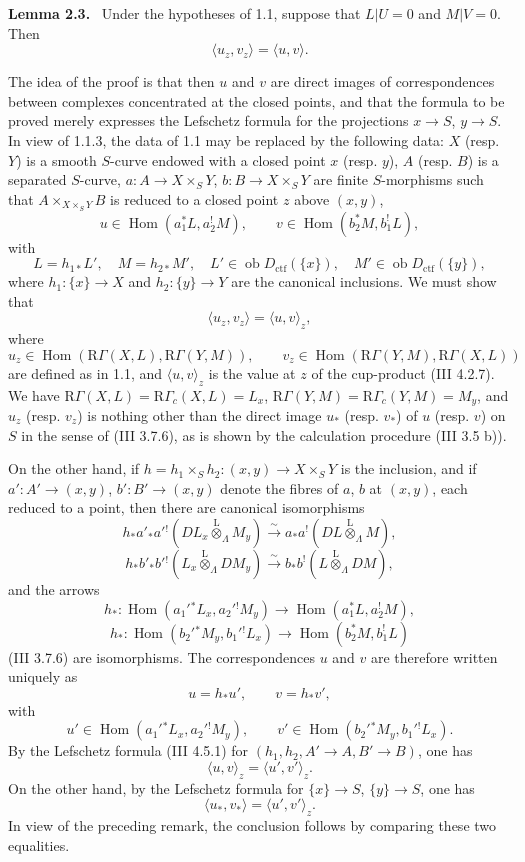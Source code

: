 \documentclass[11pt]{article}
\newenvironment{statement}[1]{\par\medskip\noindent\textbf{#1.}\ }{\par\medskip}
\DeclareMathOperator{\Hom}{Hom}
\providecommand{\lten}{\overset{\mathrm L}{\otimes}}
\providecommand{\Ob}{\operatorname{ob}}
\providecommand{\Hom}{\operatorname{Hom}}
\providecommand{\lten}{\overset{\mathrm L}{\otimes}}
\providecommand{\lten}{\overset{\mathrm L}{\otimes}}
\providecommand{\Ob}{\operatorname{ob}}
\providecommand{\lten}{\overset{\mathrm L}{\otimes}}
\providecommand{\lten}{\overset{\mathrm L}{\otimes}}
\providecommand{\Ob}{\operatorname{Ob}}
\providecommand{\lten}{\overset{\mathrm L}{\otimes}}
\begin{document}
\begin{statement}{Lemma 2.3}
Under the hypotheses of 1.1, suppose that $L|U=0$ and $M|V=0$. Then
\[
\langle u_z,v_z\rangle=\langle u,v\rangle .
\]
\end{statement}

The idea of the proof is that then $u$ and $v$ are direct images of correspondences between complexes concentrated at the closed points, and that the formula to be proved merely expresses the Lefschetz formula for the projections $x\to S$, $y\to S$. In view of 1.1.3, the data of 1.1 may be replaced by the following data: $X$ (resp. $Y$) is a smooth $S$-curve endowed with a closed point $x$ (resp. $y$), $A$ (resp. $B$) is a separated $S$-curve, $a:A\to X\times_S Y$, $b:B\to X\times_S Y$ are finite $S$-morphisms such that $A\times_{X\times_SY}B$ is reduced to a closed point $z$ above $(x,y)$,
\[
u\in\Hom(a_1^*L,a_2^!M),\qquad v\in\Hom(b_2^*M,b_1^!L),
\]
with
\[
L=h_{1*}L',\quad M=h_{2*}M',\quad
L'\in\Ob D_{\mathrm{ctf}}(\{x\}),\quad M'\in\Ob D_{\mathrm{ctf}}(\{y\}),
\]
where $h_1:\{x\}\to X$ and $h_2:\{y\}\to Y$ are the canonical inclusions. We must show that
\[
\langle u_z,v_z\rangle=\langle u,v\rangle_z,
\]
where
\[
u_z\in\Hom(\mathrm R\Gamma(X,L),\mathrm R\Gamma(Y,M)),\qquad
v_z\in\Hom(\mathrm R\Gamma(Y,M),\mathrm R\Gamma(X,L))
\]
are defined as in 1.1, and $\langle u,v\rangle_z$ is the value at $z$ of the cup-product (III 4.2.7). We have $\mathrm R\Gamma(X,L)=\mathrm R\Gamma_c(X,L)=L_x$, $\mathrm R\Gamma(Y,M)=\mathrm R\Gamma_c(Y,M)=M_y$, and $u_z$ (resp. $v_z$) is nothing other than the direct image $u_*$ (resp. $v_*$) of $u$ (resp. $v$) on $S$ in the sense of (III 3.7.6), as is shown by the calculation procedure (III 3.5 b)).

On the other hand, if $h=h_1\times_Sh_2:(x,y)\to X\times_SY$ is the inclusion, and if $a':A'\to(x,y)$, $b':B'\to(x,y)$ denote the fibres of $a$, $b$ at $(x,y)$, each reduced to a point, then there are canonical isomorphisms
\[
h_*a'_*a'{}^!(DL_x\lten_{\Lambda}M_y)
 \xrightarrow{\sim} a_*a^!(DL\lten_{\Lambda}M),
\]
\[
h_*b'_*b'{}^!(L_x\lten_{\Lambda}DM_y)
 \xrightarrow{\sim} b_*b^!(L\lten_{\Lambda}DM),
\]
and the arrows
\[
h_*:\Hom(a_1'{}^*L_x,a_2'{}^!M_y)\to \Hom(a_1^*L,a_2^!M),
\]
\[
h_*:\Hom(b_2'{}^*M_y,b_1'{}^!L_x)\to \Hom(b_2^*M,b_1^!L)
\]
(III 3.7.6) are isomorphisms. The correspondences $u$ and $v$ are therefore written uniquely as
\[
u=h_*u',\qquad v=h_*v',
\]
with
\[
u'\in\Hom(a_1'{}^*L_x,a_2'{}^!M_y),\qquad
v'\in\Hom(b_2'{}^*M_y,b_1'{}^!L_x).
\]
By the Lefschetz formula (III 4.5.1) for $(h_1,h_2,A'\to A,B'\to B)$, one has
\[
\langle u,v\rangle_z=\langle u',v'\rangle_z .
\]
On the other hand, by the Lefschetz formula for $\{x\}\to S$, $\{y\}\to S$, one has
\[
\langle u_*,v_*\rangle=\langle u',v'\rangle_z .
\]
In view of the preceding remark, the conclusion follows by comparing these two equalities.
\end{document}
